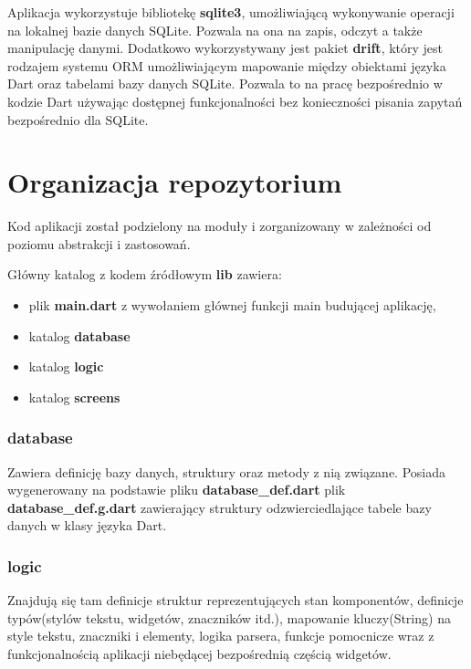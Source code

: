 Aplikacja wykorzystuje bibliotekę \textbf{sqlite3}, umożliwiającą wykonywanie operacji na lokalnej bazie danych SQLite. Pozwala na ona na zapis, odczyt a także manipulację danymi. Dodatkowo wykorzystywany jest pakiet \textbf{drift}, który jest rodzajem systemu ORM umożliwiającym mapowanie między obiektami języka Dart oraz tabelami bazy danych SQLite. Pozwala to na pracę bezpośrednio w kodzie Dart używając dostępnej funkcjonalności bez konieczności pisania zapytań bezpośrednio dla SQLite.

\section{Organizacja repozytorium}

Kod aplikacji został podzielony na moduły i zorganizowany w zależności od poziomu abstrakcji i zastosowań.

Główny katalog z kodem źródłowym \textbf{lib} zawiera:

\begin{itemize}
    \item plik \textbf{main.dart} z wywołaniem głównej funkcji main budującej aplikację,
    \item katalog \textbf{database}
    \item katalog \textbf{logic}
    \item katalog \textbf{screens}
\end{itemize}

\subsubsection{database}

Zawiera definicję bazy danych, struktury oraz metody z nią związane. Posiada wygenerowany na podstawie pliku \textbf{database\_{}def.dart} plik \textbf{database\_{}def.g.dart} zawierający struktury odzwierciedlające tabele bazy danych w klasy języka Dart. 

\subsubsection{logic}

Znajdują się tam definicje struktur reprezentujących stan komponentów, definicje typów(stylów tekstu, widgetów, znaczników itd.), mapowanie kluczy(String) na style tekstu, znaczniki i elementy, logika parsera, funkcje pomocnicze wraz z funkcjonalnością aplikacji niebędącej bezpośrednią częścią widgetów.

